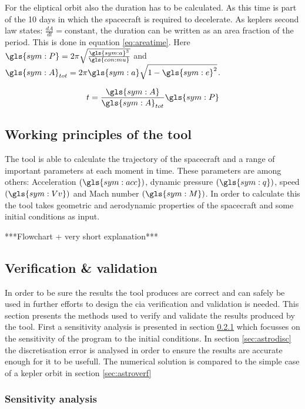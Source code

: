 For the eliptical orbit also the duration has to be calculated. As this time is part of the 10 days in which the spacecraft is required to decelerate. As keplers second law states: $\frac{dA}{dt}=\mbox{constant}$, the duration can be written as an area fraction of the period. This is done in equation \ref{eq:areatime}. Here $\gls{sym:P} = 2\pi\sqrt{\frac{\gls{sym:a}^3}{\gls{con:mu}}}$ and $\gls{sym:A}_{tot} = 2\pi \gls{sym:a} \sqrt{1-\gls{sym:e}^2}$.

\begin{equation}
t = \frac{\gls{sym:A}}{\gls{sym:A}_{tot}}\gls{sym:P}
\label{eq:areatime}
\end{equation}

\subsection{Working principles of the tool}
\label{sec:astrowp}
The tool is able to calculate the trajectory of the spacecraft and a range of important parameters at each moment in time. These parameters are among others: Acceleration $\left(\gls{sym:acc}\right)$, dynamic pressure $\left(\gls{sym:q}\right)$, speed $\left(\gls{sym:Vv}\right)$ and Mach number $\left(\gls{sym:M}\right)$. In order to calculate this the tool takes geometric and aerodynamic properties of the spacecraft and some initial conditions as input.

***Flowchart + very short explanation***\\

\subsection{Verification \& validation}
\label{sec:astrovv}

In order to be sure the results the tool produces are correct and can safely be used in further efforts to design the \gls{cia} verification and validation is needed. This section presents the methods used to verify and validate the results produced by the tool. First a sensitivity analysis is presented in section \ref{sec:astrosens} which focusses on the sensitivity of the program to the initial conditions. In section \ref{sec:astrodisc} the discretisation error is analysed in order to ensure the results are accurate enough for it to be usefull. The numerical solution is compared to the simple case of a kepler orbit in section \ref{sec:astroverf}

\subsubsection{Sensitivity analysis}
\label{sec:astrosens}

